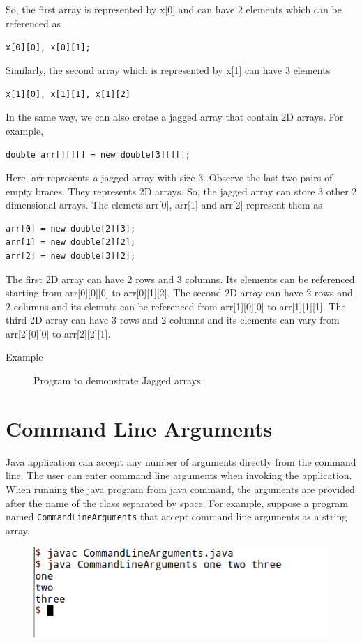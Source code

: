 \documentclass[11pt,a4paper]{article}
\begin{document}
\begin{description}
So, the first array is represented by x[0] and can have 2 elements which can be referenced as

\lstinline!x[0][0], x[0][1];!

Similarly, the second array which is represented by x[1] can have 3 elements

\lstinline!x[1][0], x[1][1], x[1][2]!

In the same way, we can also cretae a jagged array that contain 2D arrays. For example,

\lstinline!double arr[][][] = new double[3][][];!

Here, arr represents a jagged array with size 3. Observe the last two pairs of empty braces. They represents 2D arrays. So, the jagged array can store 3 other 2 dimensional arrays. The elemets arr[0], arr[1] and arr[2] represent them as

\begin{lstlisting}[numbers=none]
arr[0] = new double[2][3];
arr[1] = new double[2][2];
arr[2] = new double[3][2];
\end{lstlisting}

The first 2D array can have  2 rows and 3 columns. Its elements can be referenced starting from arr[0][0][0] to arr[0][1][2]. The second 2D array can have 2 rows and 2 columns and its elemnts can be referenced from arr[1][0][0] to arr[1][1][1]. The third 2D array can have 3 rows and 2 columns and its elements can vary from arr[2][0][0] to arr[2][2][1].

\begin{description}
\item[Example] Program to demonstrate Jagged arrays.

\end{description}
\end{description}

\section*{Command Line Arguments}
Java application can accept any number of arguments directly from the command line. The user can enter command line arguments when invoking the
application. When running the java program from java command, the arguments are provided after the name of the class separated by space. For example, suppose a program named \texttt{CommandLineArguments} that accept command line arguments as a string array.


\begin{figure}[H]
 \begin{center}
   \includegraphics[scale=0.5]{CommandLineArguments.png}
 \end{center}
 \end{figure}
\end{document}

